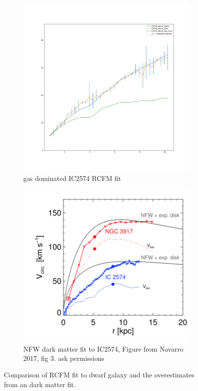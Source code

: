 \documentclass[reprint,%
 amsmath,amssymb,
 aps,
]{revtex4-1}
\begin{document}
 \begin{figure}[ht] 
  \begin{subfigure}[b]{0.5\linewidth}
    \centering
    \includegraphics[width=0.75\linewidth]{figures/IC2574_rotmod_XueSofue.png} 
    \caption{gas dominated IC2574 RCFM fit} 
    \label{fig:IC2574} 
    \vspace{4ex}
  \end{subfigure}%
  \begin{subfigure}[b]{0.5\linewidth}
    \centering
    \includegraphics[width=0.75\linewidth]{figures/Navarro2017Fig3.png} 
    \caption{NFW dark matter fit to IC2574, Figure from Navarro 2017, fig 3. ask permissions} 
    \label{fig:Nav17} 
    \vspace{4ex}
  \end{subfigure} 
  \caption{Comparison of RCFM fit to dwarf galaxy and the overestimates from an dark matter fit\cite{2017MNRAS.471.1841N}. }
  \label{fig:CompareIC2574} 
\end{figure}
\end{document}
